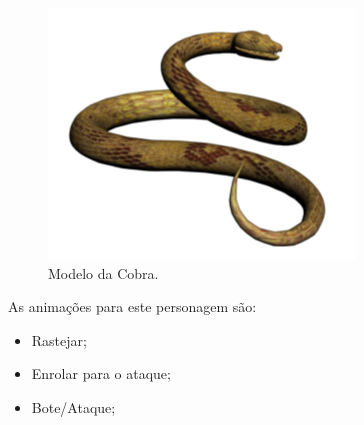 \begin{itemize}
\begin{figure}[ht]
 \centering
 \includegraphics[scale=0.7]{Imagens/cobra01.png}
 \caption{Modelo da Cobra.}
\label{img:cobra}
\end{figure}


As animações para este personagem são:
\begin{itemize}
\item Rastejar;
\item Enrolar para o ataque;
\item Bote/Ataque;
\end{itemize}
\end{itemize}

